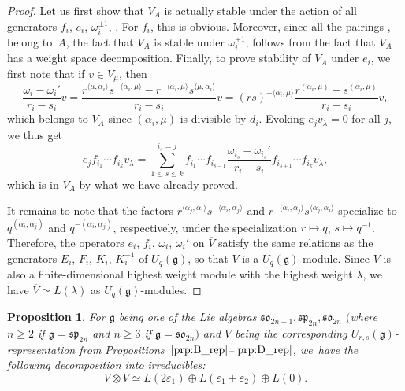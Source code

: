 \documentclass[pdftex]{sigma}
\numberwithin{equation}{section}
\newtheorem{Proposition}[Theorem]{Proposition}
 { \theoremstyle{definition}
\newtheorem{Definition}[Theorem]{Definition}
\newtheorem{Note}[Theorem]{Note}
\newtheorem{Example}[Theorem]{Example}
\newtheorem{Remark}[Theorem]{Remark} }
\newcommand{\fg}{\mathfrak{g}}
\newcommand{\sso}{\mathfrak{so}}
\newcommand{\ssp}{\mathfrak{sp}}
\begin{document}
\begin{proof}
Let us first show that $V_{A}$ is actually stable under the action of all generators $f_{i}$, $e_{i}$, $\omega_{i}^{\pm 1}$, . For $f_{i}$, this is obvious. Moreover, since all the pairings ,  belong to~$A$, the fact that $V_{A}$ is stable under $\omega_{i}^{\pm 1}$,  follows from the fact that $V_{A}$ has a weight space decomposition. Finally, to prove stability of $V_A$ under $e_{i}$, we first note that if $v \in V_{\mu}$, then
\[
 \frac{\omega_{i} - \omega_{i}'}{r_i - s_i} v =
 \frac{r^{\langle \mu,\alpha_{i}\rangle}s^{-\langle \alpha_{i},\mu \rangle} - r^{-\langle \alpha_{i},\mu\rangle}s^{\langle \mu,\alpha_{i}\rangle}}{r_i - s_i} v =
 (rs)^{-\langle \alpha_{i},\mu\rangle}\frac{r^{(\alpha_{i},\mu)} - s^{(\alpha_{i},\mu)}}{r_i - s_i} v,
\]
which belongs to $V_{A}$ since $(\alpha_{i},\mu)$ is divisible by $d_i$. Evoking $e_{j}v_{\lambda} = 0$ for all $j$, we thus get
\[
 e_{j}f_{i_1}\cdots f_{i_k} v_{\lambda} =
 \sum_{1\leq s\leq k}^{i_s=j} f_{i_{1}} \cdots f_{i_{s-1}} \frac{\omega_{i_{s}} - \omega_{i_{s}}'}{r_i - s_i}
 f_{i_{s + 1}} \cdots f_{i_{k}} v_{\lambda},
\]
which is in $V_{A}$ by what we have already proved.


It remains to note that the factors $r^{\langle \alpha_{j},\alpha_{i}\rangle}s^{-\langle \alpha_{i},\alpha_{j}\rangle}$ and $r^{-\langle \alpha_{i},\alpha_{j}\rangle}s^{\langle \alpha_{j},\alpha_{i}\rangle}$ specialize to $q^{(\alpha_i,\alpha_j)}$ and $q^{-(\alpha_i,\alpha_j)}$, respectively, under the specialization $r\mapsto q$, $s\mapsto q^{-1}$. Therefore, the operators $e_{i}$, $f_{i}$, $\omega_{i}$, $\omega_{i}'$ on $\overline{V}$ satisfy the same relations as the generators $E_{i}$, $F_{i}$, $K_{i}$, $K_{i}^{-1}$ of $U_{q}(\fg)$, so that $\overline{V}$ is a $U_{q}(\mathfrak{g})$-module. Since $\overline{V}$ is also a finite-dimensional highest weight module with the highest weight $\lambda$, we have $\overline{V} \simeq L(\lambda)$ as $U_{q}(\fg)$-modules.
\end{proof}


\begin{Proposition}\label{prop:struct}
For $\fg$ being one of the Lie algebras $\sso_{2n + 1}, \ssp_{2n}, \sso_{2n}$ $($where $n \geq 2$ if $\fg=\mathfrak{sp}_{2n}$ and $n\geq 3$ if $\fg=\mathfrak{so}_{2n})$ and $V$ being the corresponding $U_{r,s}(\fg)$-representation from Propositions~$\ref{prp:B_rep}$--$\ref{prp:D_rep}$, we~have the following decomposition into irreducibles:
\begin{equation}\label{eq:irr-decomp}
 V \otimes V \simeq L(2\varepsilon_{1})\oplus L(\varepsilon_{1} + \varepsilon_{2}) \oplus L(0).
\end{equation}
\end{Proposition}
\end{document}
